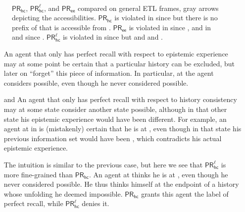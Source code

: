 \documentclass{article}
\newcommand{\PRhc}{\ensuremath{\mathsf{PR_{hc}}}\xspace}
\newcommand{\PRhcl}{\ensuremath{\mathsf{PR_{hc}^\ell}}\xspace}
\newcommand{\PRee}{\ensuremath{\mathsf{PR_{ee}}}\xspace}
\newcounter{#1}
\begin{document}
\begin{figure}
{    ~
  }
  \hfill
  \caption{\PRhc, \PRhcl, and \PRee compared on general ETL frames,
    gray arrows depicting the accessibilities.
    \PRhc is violated in 
    since  but there is no prefix of  that is accessible from .
    \PRee is violated in 
    since ,
    and in  and 
    since .
    \PRhcl is violated in 
    since  but  and  and .
}
  \label{fig:pr-ee-pr-hc}
\end{figure}

\begin{itemize}
  \item[\subref{fig:pr-ee-pr-hc:ee-not-hc}]
    An agent that only has perfect recall with respect to epistemic experience
    may at some point be certain that a particular history can be excluded,
    but later on ``forget'' this piece of information.
    In particular, at  the agent considers  possible,
    even though he never considered  possible.
  \item[\subref{fig:pr-ee-pr-hc:hc-not-ee-1} and \subref{fig:pr-ee-pr-hc:hc-not-ee-2}]
    An agent that only has perfect recall with respect to history consistency
    may at some state consider another state possible,
    although in that other state his epistemic experience would have been different.
    For example, an agent at  in 
    is (mistakenly) certain that he is at ,
    even though in that state his previous information set would have been ,
    which contradicts his actual epistemic experience.
  \item[\subref{fig:pr-ee-pr-hc:hc-not-hcl}]
    The intuition is similar to the previous case,
    but here we see that \PRhcl is more fine-grained than \PRhc.
    An agent at  thinks he is at ,
    even though he never considered  possible.
    He thus thinks himself at the endpoint of a history whose unfolding he deemed impossible.
    \PRhc grants this agent the label of perfect recall,
    while \PRhcl denies it.
\end{itemize}
\end{document}
